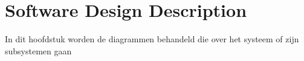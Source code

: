 \section{Software Design Description}
In dit hoofdstuk worden de diagrammen behandeld die over het systeem of zijn subsystemen gaan
